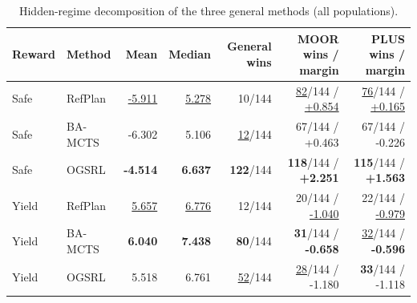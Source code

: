 \begin{table}[htbp]
\centering
\footnotesize
\caption{Hidden-regime decomposition of the three general methods (all populations).}
\label{tab:hidden-general-methods}
\begin{tabular}{llrrrrr}
\toprule
Reward & Method & Mean & Median & General wins & MOOR wins / margin & PLUS wins / margin \\
\midrule
Safe & RefPlan & \underline{-5.911} & \underline{5.278} & 10/144 & \underline{82}/144 / \underline{+0.854} & \underline{76}/144 / \underline{+0.165} \\
Safe & BA-MCTS & -6.302 & 5.106 & \underline{12}/144 & 67/144 / +0.463 & 67/144 / -0.226 \\
Safe & OGSRL & \textbf{-4.514} & \textbf{6.637} & \textbf{122}/144 & \textbf{118}/144 / \textbf{+2.251} & \textbf{115}/144 / \textbf{+1.563} \\
Yield & RefPlan & \underline{5.657} & \underline{6.776} & 12/144 & 20/144 / \underline{-1.040} & 22/144 / \underline{-0.979} \\
Yield & BA-MCTS & \textbf{6.040} & \textbf{7.438} & \textbf{80}/144 & \textbf{31}/144 / \textbf{-0.658} & \underline{32}/144 / \textbf{-0.596} \\
Yield & OGSRL & 5.518 & 6.761 & \underline{52}/144 & \underline{28}/144 / -1.180 & \textbf{33}/144 / -1.118 \\
\bottomrule
\end{tabular}
\end{table}

